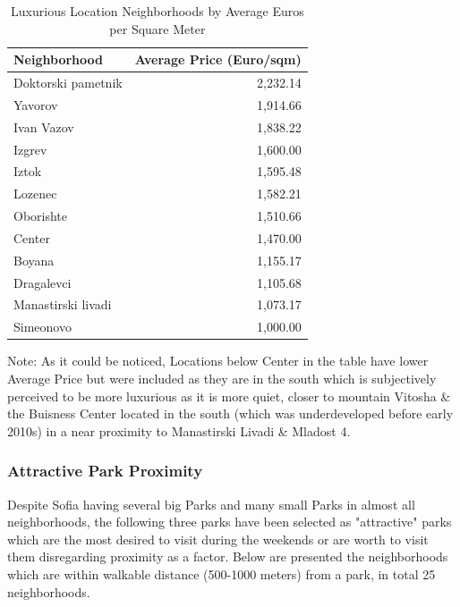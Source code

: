 \documentclass[]{article}
\begin{document}
\begin{table}[H] %
	\centering
	\caption{Luxurious Location Neighborhoods by Average Euros per Square Meter}
	\begin{tabular}{l r} %
		\hline
		\textbf{Neighborhood}               & \textbf{Average Price (Euro/sqm)} \\ \hline
		Doktorski pametnik                   & 2,232.14                          \\ 
		Yavorov                             & 1,914.66                          \\ 
		Ivan Vazov                          & 1,838.22                          \\ 
		Izgrev                              & 1,600.00                          \\ 
		Iztok                               & 1,595.48                          \\ 
		Lozenec                             & 1,582.21                          \\ 
		Oborishte                           & 1,510.66                          \\ 
		Center                              & 1,470.00                          \\ \hline
		Boyana                              & 1,155.17                          \\ 
		Dragalevci                          & 1,105.68                          \\ 
		Manastirski livadi                  & 1,073.17                          \\ 
		Simeonovo                           & 1,000.00                          \\ \hline
	\end{tabular}
\end{table}
\begin{center}
	\scriptsize
	Note: As it could be noticed, Locations below Center in the table have lower Average Price but were included as they are in the south which is subjectively perceived to be more luxurious as it is more quiet, closer to mountain Vitosha \& the Buisness Center located in the south (which was underdeveloped before early 2010s) in a near proximity to Manastirski Livadi \& Mladost 4.
\end{center}


\subsubsection{Attractive Park Proximity}
Despite Sofia having several big Parks and many small Parks in almost all neighborhoods, the following three parks have been selected as "attractive" parks which are the most desired to visit during the weekends or are worth to visit them disregarding proximity as a factor. Below are presented the neighborhoods which are within walkable distance (500-1000 meters) from a park, in total 25 neighborhoods.
\end{document}

